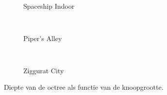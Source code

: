 \begin{figure}[t]
\begin{subfigure}[b]{\textwidth}
  \end{subfigure}\hfill\\
  \begin{minipage}[t]{0.5\textwidth}
  \begin{adjustbox}{minipage=\textwidth, scale=0.55}
    \begin{subfigure}[b]{1.6\textwidth}
      \centering
      \def\svgwidth{\textwidth}
      
      \caption{Spaceship Indoor}
      \vspace{4pt}
      \label{fig:hs-n-layers:indoor}
    \end{subfigure}
  \end{adjustbox} \\
  \begin{adjustbox}{minipage=\textwidth, scale=0.55}
    \begin{subfigure}[b]{1.6\textwidth}
      \centering
      \def\svgwidth{\textwidth}
      
      \caption{Piper's Alley}
      \vspace{4pt}
      \label{fig:hs-n-layers:alley}
    \end{subfigure}
  \end{adjustbox} \\
  \begin{adjustbox}{minipage=\textwidth, scale=0.55}
    \begin{subfigure}[b]{1.6\textwidth}
      \centering
      \def\svgwidth{\textwidth}
      
      \caption{Ziggurat City}
      \label{fig:hs-n-layers:city}
    \end{subfigure}
  \end{adjustbox}
  \caption{\small Diepte van de octree als functie van de knoopgrootte.}
  \label{fig:hs-n-layers}
  \end{minipage} %
  \begin{minipage}[t]{0.5\textwidth}
  \begin{adjustbox}{minipage=\textwidth, scale=0.55}

\end{adjustbox}
\end{minipage}
\end{figure}
